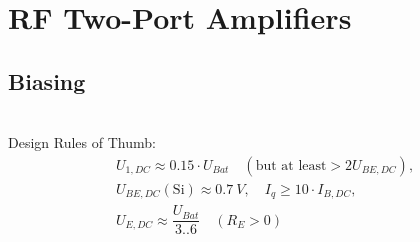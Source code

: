 \section{RF Two-Port Amplifiers}
\subsection{Biasing}
\\
Design Rules of Thumb:
\begin{align*}
    &U_{1,DC} \approx 0.15 \cdot U_{Bat} \quad (\text{but at least} >2U_{BE,DC}),\\
    &U_{BE,DC}(\mathrm{Si}) \approx \SI{0.7}{V}, \quad I_q \ge 10 \cdot I_{B,DC},\\
    &U_{E,DC} \approx \dfrac{U_{Bat}}{3..6} \quad (R_E > 0)
\end{align*}
